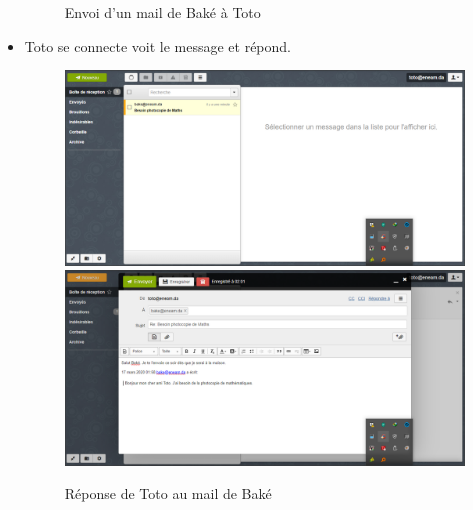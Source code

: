 \documentclass[a4paper,12pt,french]{report} %
\begin{document}
\begin{itemize}
\begin{figure}[H]
\caption{Envoi d'un mail de Baké à Toto}
\end{figure}

\item Toto se connecte voit le message et répond.
\begin{figure}[H]
\centering
\includegraphics[width=483pt]{figure/toto_see_mail_from_bake1.png} \\[1cm]
\includegraphics[width=483pt]{figure/toto_reply_to_bake1.png}
\caption{Réponse de Toto au mail de Baké}
\end{figure} 


\end{itemize}
\end{document}

